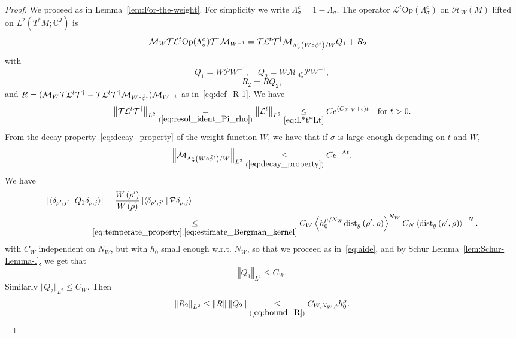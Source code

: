 \documentclass[AHL,Unicode,longabstracts,published]{cedram}
\newcommand*\eq[1]{\underset{(#1)}{=}}
\newcommand*\ineq[1]{\underset{(#1)}{\leq}}
\newcommand{\clT}{\mathcal{T}}
\newcommand{\clH}{\mathcal{H}}
\newcommand{\clL}{\mathcal{L}}
\newcommand{\clM}{\mathcal{M}}
\newcommand{\clP}{\mathcal{P}}
\newcommand{\dist}{\mathrm{dist}}
\newcommand{\bbC}{\mathbb{C}}
\let\oldtilde\tilde
\renewcommand*{\tilde}[1]{\mathchoice{\widetilde{#1}}{\widetilde{#1}}{\oldtilde{#1}}{\oldtilde{#1}}}
\newcommand{\clH}{\mathcal{H}}
\begin{document}
\begin{proof}
We proceed as in Lemma~\ref{lem:For-the-weight}. For simplicity we write $\Lambda_{\sigma}^{c}=1-\Lambda_{\sigma}$. The operator $\ensuremath{\clL^{t}}\textrm{Op}(\Lambda_{\sigma}^{c})$ on $\clH _{W}(M)$ lifted on $L^{2}(T^{*}M;\bbC^{J})$ is
\begin{align*}
\clM_{W}\text{\ensuremath{\clT}\ensuremath{\clL^{t}}\textrm{Op}\ensuremath{\left(\Lambda_{\sigma}^{c}\right)}\ensuremath{\ensuremath{\clT^{\dagger}}}}\clM_{W^{-1}} & =\ensuremath{\clT}\ensuremath{\clL^{t}}\ensuremath{\clT^{\dagger}}\clM_{\Lambda_{\sigma}^{c}\left(W\circ\tilde{\phi}^{t}\right)/W}Q_{1}+R_{2}
\end{align*}
with
\[
Q_{1}=W\clP W^{-1},\quad Q_{2}=W\clM_{\Lambda_{\sigma}^{c}}\clP W^{-1},
\]
\[
R_{2}=RQ_{2},
\]
and $R=(\clM_{W}\text{\ensuremath{\clT}\ensuremath{\clL^{t}}\ensuremath{\clT^{\dagger}}}-\text{\ensuremath{\clT}\ensuremath{\clL^{t}}\ensuremath{\clT^{\dagger}}}\clM_{W\circ\tilde{\phi}^{t}})\clM_{W^{-1}}$ as in~\eqref{eq:def_R-1}. We have
\[
\left\Vert \ensuremath{\clT}\ensuremath{\clL^{t}}\ensuremath{\clT^{\dagger}}\right\Vert _{L^{2}}\eq{\ref{eq:resol_ident_Pi_rho}}\ensuremath{\left\Vert \clL^{t}\right\Vert _{L^{2}}}\underset{\eqref{eq:L*t*Lt}}{\leq}Ce^{\left(C_{X,V}+\epsilon\right)t}\quad\text{for }t>0.
\]
From the decay property~\eqref{eq:decay_property} of the weight function $W$, we have that if $\sigma$ is large enough depending on $t$ and $W$,
\[
\left\Vert \clM_{\Lambda_{\sigma}^{c}\left(W\circ\tilde{\phi}^{t}\right)/W}\right\Vert _{L^{2}}\ineq{\ref{eq:decay_property}}Ce^{-\Lambda t}.
\]
We have
\begin{align*}
\left|\left\langle\delta_{\rho',j'}\,\middle|\,Q_{1}\delta_{\rho,j}\right\rangle\right| & =\frac{W\left(\rho'\right)}{W\left(\rho\right)}\left|\langle\delta_{\rho',j'}\,\middle|\,\clP \delta_{\rho,j}\rangle\right|\\
& \mkern-29mu\underset{\eqref{eq:temperate_property},\eqref{eq:estimate_Bergman_kernel}}{\leq}C_{W}\left\langle h_{0}^{\mu/N_{W}}\dist_{g}\left(\rho',\rho\right)\right\rangle ^{N_{W}}C_{N}\left\langle \dist_{g}\left(\rho',\rho\right)\right\rangle ^{-N}.
\end{align*}
with $C_{W}$ independent on $N_{W}$, but with $h_{0}$ small enough w.r.t. $N_{W}$, so that we proceed as in~\eqref{eq:aide}, and by Schur Lemma~\ref{lem:Schur-Lemma-.}, we get that
\[
\left\Vert Q_{1}\right\Vert _{L^{2}}\le C_{W}.
\]
Similarly $\Vert Q_{2}\Vert _{L^{2}}\le C_{W}$. Then
\[
\left\Vert R_{2}\right\Vert _{L^{2}}\le\left\Vert R\right\Vert \left\Vert Q_{2}\right\Vert \ineq{\ref{eq:bound_R}}C_{W,N_{W},t}h_{0}^{\mu}.
\]
\end{proof}
\end{document}
